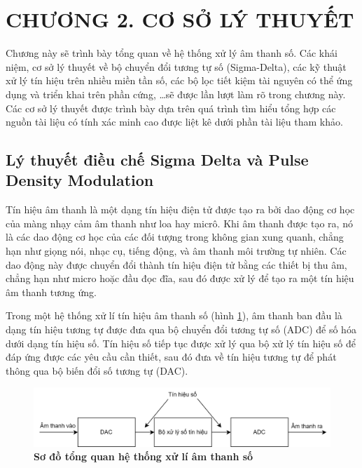 \section*{CHƯƠNG 2. CƠ SỞ LÝ THUYẾT} \label{chuong2}
\setcounter{section}{2}
\setcounter{figure}{0}
\setcounter{table}{0}
Chương này sẽ trình bày tổng quan về hệ thống xử lý âm thanh số. Các khái niệm, cơ sở lý thuyết về bộ chuyển đổi tương tự số (Sigma-Delta), các kỹ thuật xử lý tín hiệu trên nhiều miền tần số, các bộ lọc tiết kiệm tài nguyên có thể ứng dụng và triển khai trên phần cứng, \ldots sẽ được lần lượt làm rõ trong chương này. Các cơ sở lý thuyết được trình bày dựa trên quá trình tìm hiểu tổng hợp các nguồn tài liệu có tính xác minh cao được liệt kê dưới phần tài liệu tham khảo.

\subsection{ Lý thuyết điều chế Sigma Delta và Pulse Density Modulation}
Tín hiệu âm thanh là một dạng tín hiệu điện tử được tạo ra bởi dao động cơ học của màng nhạy cảm âm thanh như loa hay micrô. Khi âm thanh được tạo ra, nó là các dao động cơ học của các đối tượng trong không gian xung quanh, chẳng hạn như giọng nói, nhạc cụ, tiếng động, và âm thanh môi trường tự nhiên. Các dao động này được chuyển đổi thành tín hiệu điện tử bằng các thiết bị thu âm, chẳng hạn như micro hoặc đầu đọc đĩa, sau đó được xử lý để tạo ra một tín hiệu âm thanh tương ứng.

Trong một hệ thống xử lí tín hiệu âm thanh số (hình \ref{hinh21}), âm thanh ban đầu là dạng tín hiệu tương tự  được đưa qua bộ chuyển đổi tương tự số (ADC) để số hóa dưới dạng tín hiệu số. Tín hiệu số tiếp tục được xử lý qua bộ xử lý tín hiệu số để đáp ứng được các yêu cầu cần thiết, sau đó đưa về tín hiệu tương tự để phát thông qua bộ biến đổi số tương tự (DAC). 

\begin{figure}[!ht]
    \centering
    
    \includegraphics[width=15cm]{Images/top.png}
    \caption[Sơ đồ khối của hệ thống]{\bfseries \fontsize{12pt}{0pt}\selectfont Sơ đồ tổng quan hệ thống xử lí âm thanh số}
    \label{hinh21}
\end{figure}


